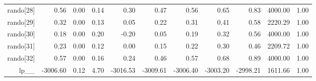 \begin{table}[ht]
\begin{tabular}{rrrrrrrrrrr}
  rando[28] & 0.56 & 0.00 & 0.14 & 0.30 & 0.47 & 0.56 & 0.65 & 0.83 & 4000.00 & 1.00 \\ 
  rando[29] & 0.32 & 0.00 & 0.13 & 0.05 & 0.22 & 0.31 & 0.41 & 0.58 & 2220.29 & 1.00 \\ 
  rando[30] & 0.18 & 0.00 & 0.20 & -0.20 & 0.05 & 0.19 & 0.32 & 0.56 & 4000.00 & 1.00 \\ 
  rando[31] & 0.23 & 0.00 & 0.12 & 0.00 & 0.15 & 0.22 & 0.30 & 0.46 & 2209.72 & 1.00 \\ 
  rando[32] & 0.57 & 0.00 & 0.16 & 0.24 & 0.46 & 0.57 & 0.68 & 0.89 & 4000.00 & 1.00 \\ 
  lp\_\_ & -3006.60 & 0.12 & 4.70 & -3016.53 & -3009.61 & -3006.40 & -3003.20 & -2998.21 & 1611.66 & 1.00 \\ 
   \hline
\end{tabular}
\label{scalefit_tab}
\end{table}
